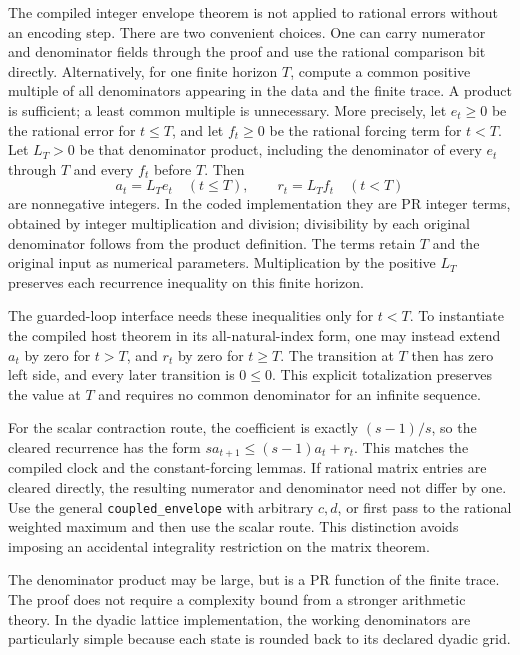 The compiled integer envelope theorem is not applied to rational
errors without an encoding step. There are two convenient choices.
One can carry numerator and denominator fields through the proof
and use the rational comparison bit directly. Alternatively, for
one finite horizon \(T\), compute a common positive multiple of
all denominators appearing in the data and the finite trace. A
product is sufficient; a least common multiple is unnecessary.
More precisely, let \(e_t\ge0\) be the rational error for
\(t\le T\), and let \(f_t\ge0\) be the rational forcing term
for \(t<T\). Let \(L_T>0\) be that denominator product, including
the denominator of every \(e_t\) through \(T\) and every
\(f_t\) before \(T\). Then
\[
 a_t=L_Te_t\quad(t\le T),\qquad
 r_t=L_Tf_t\quad(t<T)
\]
are nonnegative integers. In the coded implementation they are PR
integer terms, obtained by integer multiplication and division;
divisibility by each original denominator follows from the product
definition. The terms retain \(T\) and the original input as
numerical parameters. Multiplication by the positive \(L_T\)
preserves each recurrence inequality on this finite horizon.

The guarded-loop interface needs these inequalities only for
\(t<T\). To instantiate the compiled host theorem in its
all-natural-index form, one may instead extend \(a_t\) by zero
for \(t>T\), and \(r_t\) by zero for \(t\ge T\).
The transition at \(T\) then has zero left side, and every later
transition is \(0\le0\). This explicit totalization preserves
the value at \(T\) and requires no common denominator for an
infinite sequence.

For the scalar contraction route, the coefficient is exactly
\((s-1)/s\), so the cleared recurrence has the form
\(s a_{t+1}\le(s-1)a_t+r_t\). This matches the compiled clock
and the constant-forcing lemmas. If rational matrix entries are
cleared directly, the resulting numerator and denominator need
not differ by one. Use the general
\texttt{coupled\_envelope} with arbitrary \(c,d\), or first
pass to the rational weighted maximum and then use the scalar
route. This distinction avoids imposing an accidental integrality
restriction on the matrix theorem.

The denominator product may be large, but is a PR function of the
finite trace. The proof does not require a complexity bound from
a stronger arithmetic theory. In the dyadic lattice implementation,
the working denominators are particularly simple because each
state is rounded back to its declared dyadic grid.


